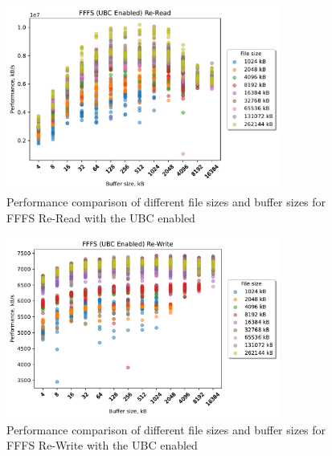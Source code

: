 \begin{figure}[!htb]
	\label{fig:bench_fffs_ubc_scatter_re-read}
	\begin{center}
		\includegraphics[width=0.8\textwidth]{figures.nosync/benchmarking/FFFS/scatter-UBC Enabled-Re-Read.pdf}
	\end{center}
	\caption[Comparison of Re-Read performance for file size and buffer size for FFFS with the UBC enabled]{Performance comparison of different file sizes and buffer sizes for FFFS Re-Read with the UBC enabled}
\end{figure}
\begin{figure}[!htb]
	\label{fig:bench_fffs_ubc_scatter_re-write}
	\begin{center}
		\includegraphics[width=0.8\textwidth]{figures.nosync/benchmarking/FFFS/scatter-UBC Enabled-Re-Write.pdf}
	\end{center}
	\caption[Comparison of Re-Write performance for file size and buffer size for FFFS with the UBC enabled]{Performance comparison of different file sizes and buffer sizes for FFFS Re-Write with the UBC enabled}
\end{figure}
\clearpage
